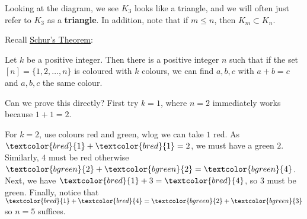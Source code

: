 \documentclass{article}
\begin{document}
\begin{center}
\end{center}

Looking at the diagram, we see $K_3$ looks like a triangle, and we will often just refer to $K_3$ as a \textbf{triangle}\label{def:triangle}.  In addition, note that if $m \leq n$, then $K_m \subset K_n$.

Recall \hyperlink{thm:schur}{Schur's Theorem}:
\begin{thm}
    Let $k$ be a positive integer. Then there is a positive integer $n$ such that if the set $[n] = \{1, 2, \dots, n\}$ is coloured with $k$ colours, we can find $a, b, c$ with $a + b = c$ and $a,b,c$ the same colour.
\end{thm}

Can we prove this directly? First try $k=1$, where $n=2$ immediately works because $1+1=2$.

\newcommand{\red}[1]{\textcolor{bred}{#1}}
\newcommand{\green}[1]{\textcolor{bgreen}{#1}}
\newcommand{\blue}[1]{\textcolor{bblue}{#1}}
\newcommand{\yellow}[1]{\textcolor{byellow}{#1}}

For $k=2$, use colours \red{red} and \green{green}, wlog we can take \red{$1$ red}.
As $\red{1}+\red{1}=2$, we must have a \green{green $2$}.
Similarly, \red{$4$} must be \red{red} otherwise $\green{2}+\green{2}=\green{4}$.
Next, we have $\red{1} + 3 = \red{4}$, so \green{$3$} must be \green{green}.
Finally, notice that $\red{1} + \red{4} = \green{2} + \green{3}$ so $n = 5$ suffices.
\end{document}
